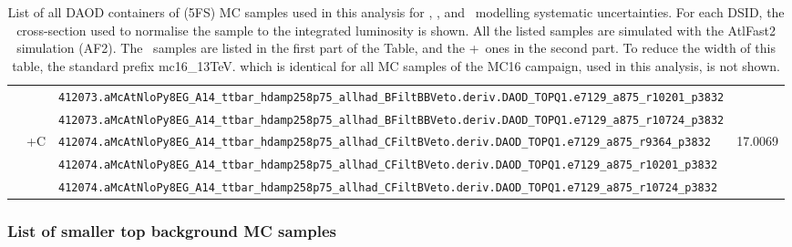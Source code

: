 \begin{table}[htbp]
{\begin{tabular}{ll|l|r}
                                                &                               & \verb|412073.aMcAtNloPy8EG_A14_ttbar_hdamp258p75_allhad_BFiltBBVeto.deriv.DAOD_TOPQ1.e7129_a875_r10201_p3832|        &  \\
                                                &                               & \verb|412073.aMcAtNloPy8EG_A14_ttbar_hdamp258p75_allhad_BFiltBBVeto.deriv.DAOD_TOPQ1.e7129_a875_r10724_p3832|        &  \\ \cline{2-4}
                                                & \multirow{3}{*}{\ttbar{}+C}   & \verb|412074.aMcAtNloPy8EG_A14_ttbar_hdamp258p75_allhad_CFiltBVeto.deriv.DAOD_TOPQ1.e7129_a875_r9364_p3832|          &  \multirow{3}{*}{17.0069} \\
                                                &                               & \verb|412074.aMcAtNloPy8EG_A14_ttbar_hdamp258p75_allhad_CFiltBVeto.deriv.DAOD_TOPQ1.e7129_a875_r10201_p3832|         &  \\
                                                &                               & \verb|412074.aMcAtNloPy8EG_A14_ttbar_hdamp258p75_allhad_CFiltBVeto.deriv.DAOD_TOPQ1.e7129_a875_r10724_p3832|         &  \\ \hline
\bottomrule
\end{tabular}}
  \caption{
    List of all DAOD containers of \ttbar(5FS) MC samples used in this analysis for \ttbin, \ttcin, and \ttlight\ modelling systematic uncertainties.
    For each DSID, the cross-section used to normalise the sample to the integrated luminosity is shown.
    All the listed samples are simulated with the AtlFast2 simulation (AF2).
    The \powhegboxherwig\ samples are listed in the first part of the Table, and the \mgamc+\pythia\ ones in the second part.
    To reduce the width of this table, the standard prefix \textsf{mc16\_13TeV.} which is identical for all MC samples of the MC16 campaign, used in this analysis, is not shown.
  }
  \label{tab:MC_samples_ttbar_systs}
\end{table}

\clearpage

\subsubsection{List of smaller top background MC samples}
\label{subsubsec:MC_samples_otherTop}

